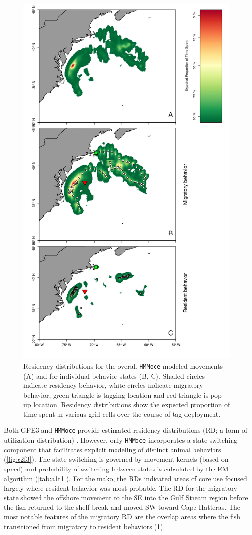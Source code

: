 \begin{figure}[p!]
\centering
\includegraphics[width=.8\textwidth]{images/C2_Fig4.pdf}
\caption[Residency distribution results from HMMoce]{Residency distributions for the overall \texttt{HMMoce}
modeled movements (A) and for individual behavior states (B, C). Shaded
circles indicate residency behavior, white circles indicate migratory
behavior, green triangle is tagging location and red triangle is pop-up
location. Residency distributions show the expected proportion of time
spent in various grid cells over the course of tag deployment.}
\label{fig:c2f4}
\end{figure}


Both GPE3 and \texttt{HMMoce} provide estimated residency distributions
(RD; a form of utilization distribution) \citep{Pedersen2011}. However,
only \texttt{HMMoce} incorporates a state-switching component that
facilitates explicit modeling of distinct animal behaviors (\cref{fig:c2f3}). The state-switching is governed by movement kernels
(based on speed) and probability of switching between states is
calculated by the EM algorithm (\cref{tab:a1t1}). For the mako, the RDs
indicated areas of core use focused largely where resident behavior was
most probable. The RD for the migratory state showed the offshore
movement to the SE into the Gulf Stream region before the fish returned
to the shelf break and moved SW toward Cape Hatteras. The most notable
features of the migratory RD are the overlap areas where the fish
transitioned from migratory to resident behaviors (\cref{fig:c2f4}).

